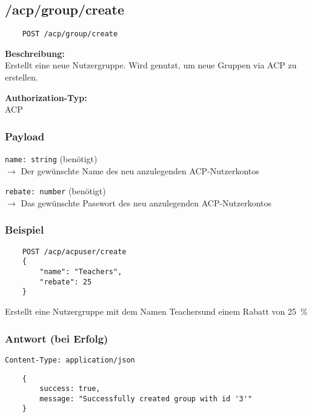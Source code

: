 \subsection{/acp/group/create}

\begin{lstlisting}
    POST /acp/group/create
\end{lstlisting}

\textbf{Beschreibung:} \\
Erstellt eine neue Nutzergruppe. Wird genutzt, um neue Gruppen via ACP zu erstellen.

\textbf{Authorization-Typ:} \\
ACP

\subsubsection{Payload}

\lstinline{name: string} (benötigt) \\
$\rightarrow$ Der gewünschte Name des neu anzulegenden ACP-Nutzerkontos

\lstinline{rebate: number} (benötigt) \\
$\rightarrow$ Das gewünschte Passwort des neu anzulegenden ACP-Nutzerkontos

\subsubsection{Beispiel}

\begin{lstlisting}
    POST /acp/acpuser/create
    {
        "name": "Teachers",
        "rebate": 25
    }
\end{lstlisting}

Erstellt eine Nutzergruppe mit dem Namen \glqq Teachers\grqq und einem Rabatt von \SI{25}{\percent}

\subsubsection{Antwort (bei Erfolg)}

\lstinline{Content-Type: application/json}
\begin{lstlisting}
    {
        success: true, 
        message: "Successfully created group with id '3'"
    }
\end{lstlisting}